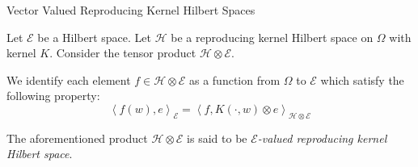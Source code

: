 \documentclass[handout]{beamer}
\newcommand{\T}{\mathbb T}
\newcommand{\calE}{{\mathcal E}}
\newcommand{\calH}{{\mathcal H}}
\newcommand{\ip}[1]{\left\langle #1 \right\rangle}
\begin{document}


\begin{frame}{Vector Valued Reproducing Kernel Hilbert Spaces}
\begin{definition}
Let $\calE$ be a Hilbert space. Let $\calH$ be a reproducing kernel Hilbert space on $\Omega$ with kernel $K$. Consider the tensor product $\calH \otimes \calE$.
\pause

We identify each element $f\in \calH \otimes \calE$ as a function from $\Omega$ to $\calE$ which satisfy the following property:
\begin{equation*}
\ip{f(w), e}_{\calE} = \ip{f, K(\cdot, w) \otimes e}_{\calH \otimes \calE}
\end{equation*}
\pause

The aforementioned product $\calH \otimes \calE$ is said to be \textit{$\calE$-valued reproducing kernel Hilbert space}.
\end{definition}

\end{frame}
\end{document}

